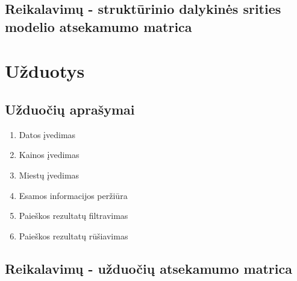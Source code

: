 \documentclass{VUMIFPSkursinis}
\begin{document}
            \subsection{Reikalavimų - struktūrinio dalykinės srities modelio atsekamumo matrica}
      
        \section{Užduotys}
            \subsection{Užduočių aprašymai}
            
                \begin{enumerate}[label=\textbf{U\arabic*}.]
                    \item Datos įvedimas
                    \item Kainos įvedimas
                    \item Miestų įvedimas
                    \item Esamos informacijos peržiūra
                    \item Paieškos rezultatų filtravimas
                    \item Paieškos rezultatų rūšiavimas
                \end{enumerate}
      
            \subsection{Reikalavimų - užduočių atsekamumo matrica}
      
      
    
        \appendix  %
      
    
\end{document}
